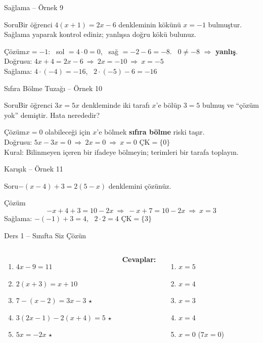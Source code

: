 \documentclass[aspectratio=169,11pt,handout]{beamer}
\newcommand{\soru}[3]{%
\begin{frame}{#1}
  \begin{block}{Soru}\large #2\end{block}
  \pause
  \begin{exampleblock}{Çözüm}\large #3\end{exampleblock}
\end{frame}}
\begin{document}
\soru{Sağlama -- Örnek 9}
{Bir öğrenci \(4(x+1)=2x-6\) denkleminin kökünü \(x=-1\) bulmuştur. Sağlama yaparak kontrol ediniz; yanlışsa doğru kökü bulunuz.}
{\(x=-1\): \ sol \(=4\cdot 0=0\), \ sağ \(=-2-6=-8\). \ \(0\neq-8\) \(\Rightarrow\) \textbf{yanlış}.\\[3pt]
Doğrusu: \(4x+4=2x-6\ \Rightarrow\ 2x=-10\ \Rightarrow\ x=-5\)\\[3pt]
Sağlama: \(4\cdot(-4)=-16\), \ \(2\cdot(-5)-6=-16\) \checkmark}

\soru{Sıfıra Bölme Tuzağı -- Örnek 10}
{Bir öğrenci \(3x=5x\) denkleminde iki tarafı \(x\)'e bölüp \(3=5\) bulmuş ve ``çözüm yok'' demiştir. Hata nerededir?}
{\(x=0\) olabileceği için \(x\)'e bölmek \textbf{sıfıra bölme} riski taşır.\\[3pt]
Doğrusu: \(5x-3x=0\ \Rightarrow\ 2x=0\ \Rightarrow\ x=0\) \qquad \(\text{ÇK}=\{0\}\)\\[3pt]
Kural: Bilinmeyen içeren bir ifadeye bölmeyin; terimleri bir tarafa toplayın.}

\soru{Karışık -- Örnek 11}
{\(-(x-4)+3=2(5-x)\) denklemini çözünüz.}
{\[-x+4+3=10-2x\ \Rightarrow\ -x+7=10-2x\ \Rightarrow\ x=3\]
Sağlama: \(-(-1)+3=4\), \ \(2\cdot 2=4\) \checkmark \qquad \(\text{ÇK}=\{3\}\)}

\begin{frame}{Ders 1 -- Sınıfta Siz Çözün}
\begin{columns}[t]
\begin{enumerate}
\item \(4x-9=11\)
\item \(2(x+3)=x+10\)
\item \(7-(x-2)=3x-3\) \(\star\)
\item \(3(2x-1)-2(x+4)=5\) \(\star\)
\item \(5x=-2x\) \(\star\)
\end{enumerate}
\pause
\textbf{Cevaplar:}
\begin{enumerate}
\item \(x=5\)
\item \(x=4\)
\item \(x=3\)
\item \(x=4\)
\item \(x=0\) \quad (\(7x=0\))
\end{enumerate}
\end{columns}
\vspace{4pt}{\footnotesize \(\star\) işaretli soruların adım adım çözümü sonraki slaytlardadır.}
\end{frame}
\end{document}
